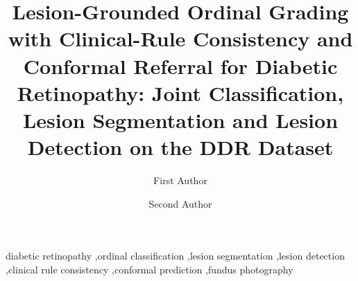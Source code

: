 \documentclass[preprint,12pt,authoryear]{elsarticle}
\begin{document}
\begin{frontmatter}
\title{Lesion-Grounded Ordinal Grading with Clinical-Rule Consistency and Conformal Referral for Diabetic Retinopathy: Joint Classification, Lesion Segmentation and Lesion Detection on the DDR Dataset}
\author[inst1]{First Author}
\author[inst1]{Second Author}

\begin{abstract}

\end{abstract}
\begin{highlights}

\end{highlights}
\begin{keyword}
diabetic retinopathy \sep ordinal classification \sep lesion segmentation \sep lesion detection \sep clinical rule consistency \sep conformal prediction \sep fundus photography
\end{keyword}
\end{frontmatter}











\appendix




\end{document}
